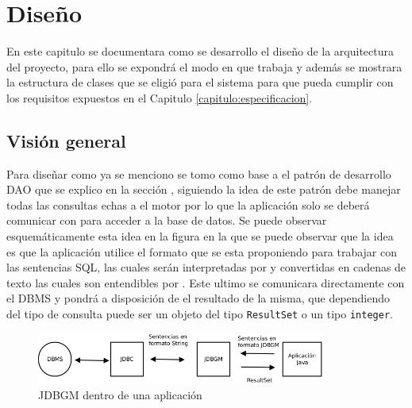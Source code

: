 \chapter{Diseño}\label{cap:disenio}

En este capitulo se documentara como se desarrollo el diseño de la arquitectura del proyecto, para ello se expondrá el modo en que trabaja \jd y además se mostrara la estructura de clases que se eligió para el sistema para que pueda cumplir con los requisitos expuestos en el Capitulo \ref{capitulo:especificacion}.
%
%
%
\section{Visión general}
Para diseñar \jj como ya se menciono se tomo como base a el patrón de desarrollo DAO que se explico en la sección , siguiendo la idea de este patrón \jj debe manejar todas las consultas echas a el motor por lo que la aplicación solo se deberá comunicar con \jj para acceder a la base de datos. Se puede observar esquemáticamente esta idea en la figura  en la que se puede observar que la idea es que la aplicación utilice el formato que se esta proponiendo para trabajar con las sentencias SQL, las cuales serán interpretadas por \jj y convertidas en cadenas de texto las cuales son entendibles por \jd. Este ultimo se comunicara directamente con el DBMS y pondrá a disposición de \jj el resultado de la misma, que dependiendo del tipo de consulta puede ser un objeto del tipo \verb=ResultSet= o un tipo \verb=integer=. 
%
\begin{figure}
  \centering
    \includegraphics[width=0.85\textwidth]{figuras/jdbgm-overview.png}
  \caption{JDBGM dentro de una aplicación}
  \label{fig:jdbgm:overview}
\end{figure}

